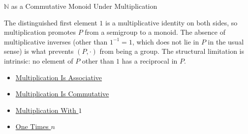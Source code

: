 \begin{topicbox}{$\mathbb{N}$ as a Commutative Monoid Under Multiplication}
\begin{remark*}[Interpretation]
The distinguished first element $1$ is a multiplicative identity on both
sides, so multiplication promotes $P$ from a semigroup to a monoid. The
absence of multiplicative inverses (other than $1^{-1} = 1$, which does not
lie in $P$ in the usual sense) is what prevents $(P,\cdot)$ from being a
group. The structural limitation is intrinsic: no element of $P$ other than
$1$ has a reciprocal in $P$.
\end{remark*}

\begin{dependencies}
\begin{itemize}
  \item \hyperref[thm:multiplication-associative]{Multiplication Is Associative}
  \item \hyperref[thm:multiplication-commutative]{Multiplication Is Commutative}
  \item \hyperref[thm:multiplication-with-one]{Multiplication With $1$}
  \item \hyperref[thm:one-times-n]{One Times $n$}
\end{itemize}
\end{dependencies}
\end{topicbox}

